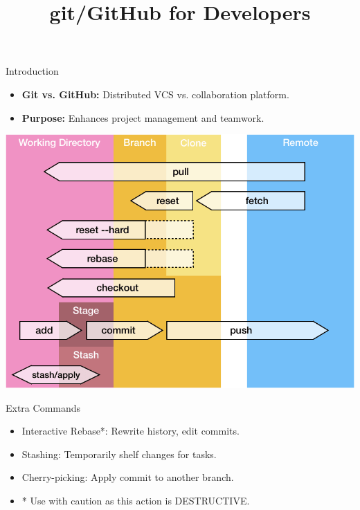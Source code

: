 \documentclass[aspectratio=169]{beamer}
\title{git/GitHub for Developers}
\institute{Engineers for Exploration, UC San Diego}
\begin{document}
\maketitle
\begin{frame}{Introduction}
    \begin{itemize}
        \item \textbf{Git vs. GitHub:} Distributed VCS vs. collaboration platform.
        \item \textbf{Purpose:} Enhances project management and teamwork.
    \end{itemize}
    \begin{center}
        \includegraphics[scale=.25]{git_commands.png}
    \end{center}
\end{frame}
\begin{frame}{Extra Commands}
    \begin{itemize}
        \item Interactive Rebase*: Rewrite history, edit commits.
        \item Stashing: Temporarily shelf changes for tasks.
        \item Cherry-picking: Apply commit to another branch.
        \item * Use with caution as this action is DESTRUCTIVE.
    \end{itemize}
\end{frame}
\end{document}
